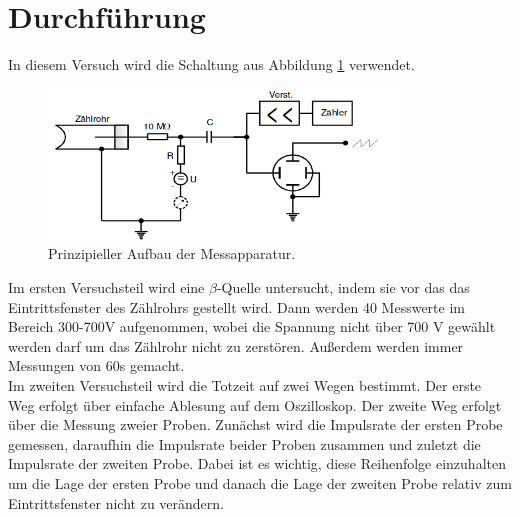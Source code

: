 \section{Durchführung}
In diesem Versuch wird die Schaltung aus Abbildung \ref{fig:schaltung} verwendet.
\begin{figure}[h]
    \centering
    \includegraphics[height=4cm]{Aufbau/Schaltung.png}
    \caption{Prinzipieller Aufbau der Messapparatur.}
    \label{fig:schaltung}
\end{figure}
Im ersten Versuchsteil wird eine $\beta$-Quelle untersucht, indem sie vor das das Eintrittsfenster des Zählrohrs gestellt wird.
Dann werden 40 Messwerte im Bereich 300-700V aufgenommen, wobei die Spannung nicht über 700 V gewählt werden darf um das Zählrohr nicht zu zerstören.
Außerdem werden immer Messungen von 60s gemacht.\\
Im zweiten Versuchsteil wird die Totzeit auf zwei Wegen bestimmt.
Der erste Weg erfolgt über einfache Ablesung auf dem Oszilloskop.
Der zweite Weg erfolgt über die Messung zweier Proben.
Zunächst wird die Impulsrate der ersten Probe gemessen, daraufhin die Impulsrate beider Proben zusammen und zuletzt die Impulsrate der zweiten Probe.
Dabei ist es wichtig, diese Reihenfolge einzuhalten um die Lage der ersten Probe und danach die Lage der zweiten Probe relativ zum Eintrittsfenster nicht zu verändern.
